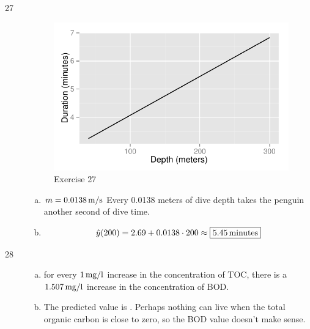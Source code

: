 \documentclass[letterpaper, landscape]{exam}
\begin{document}
  \ifprintanswers{}
    \begin{description}

      \item[27]     
        \begin{figure}[H]
          \centering
          \includegraphics[scale = 0.9]{figures/ex27.pdf}
          \caption{Exercise 27}

        \end{figure}

        \begin{enumerate}[(a)]
          \item $m = \unit[0.0138]{m/s}$  Every 0.0138 meters of dive depth
            takes the penguin another second of dive time.

        \item 
          \[
            \hat{y}(200) = 2.69 + 0.0138 \cdot 200 
                \approx \boxed{ \unit[5.45]{minutes} }
          \]
        \end{enumerate}
    
      \item[28]
        \begin{enumerate}[(a)]
          \item for every $\unit[1]{mg/l}$ increase in the concentration of TOC,
            there is a  $\unit[1.507]{mg/l}$ increase in the concentration of
            BOD\@.

          \item The predicted value is . Perhaps
          nothing can live when the total organic carbon is close to zero, so
          the BOD value doesn't make sense.
        \end{enumerate}


\end{description}
\end{document}
